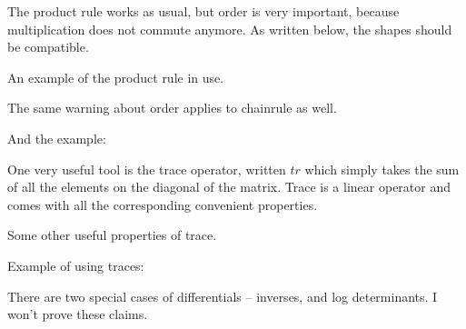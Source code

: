\documentclass[12pt]{article}
\begin{document}
The product rule works as usual, but order is very important, because multiplication does not commute anymore. As written below, the shapes should be compatible. 

An example of the product rule in use.


The same warning about order applies to chainrule as well.

And the example:


One very useful tool is the trace operator, written $tr$ which simply takes the sum of all the elements on the diagonal of the matrix. Trace is a linear operator and comes with all the corresponding convenient properties. 

Some other useful properties of trace.


Example of using traces:


There are two special cases of differentials -- inverses, and log determinants. I won't prove these claims.
\end{document}
